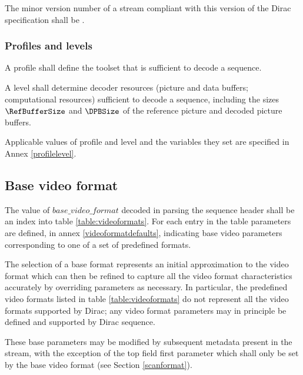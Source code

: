 The minor version number of a stream compliant with this version 
of the Dirac specification shall be \MinorVersion.


\subsubsection{Profiles and levels}

A profile shall define the toolset that is sufficient to decode a sequence. 

A level shall determine decoder resources (picture and data buffers; computational resources) sufficient
to decode a sequence, including the sizes $\RefBufferSize$ and $\DPBSize$ of 
the reference picture and decoded picture buffers. 

Applicable values of profile and level and the variables they set are specified in Annex
\ref{profilelevel}.

\subsection{Base video format}
\label{videoformat}

The value of $base\_video\_format$ decoded in parsing the sequence header shall be 
an index into table \ref{table:videoformats}. For each entry in the table 
parameters are defined, in annex \ref{videoformatdefaults}, indicating base
video parameters corresponding to one of a set of predefined formats. 

The selection of a base format represents an initial approximation to the video
format which can then be refined to capture all the video format characteristics
accurately by overriding parameters as necessary. In particular, the predefined
video formats listed in table \ref{table:videoformats} do not represent all the 
video formats supported by Dirac; any video format parameters may in principle be
defined and supported by Dirac sequence.

These base parameters may be modified by subsequent metadata present in the stream, 
with the exception of the top field first parameter which shall only be set 
by the base video format (see Section \ref{scanformat}).


